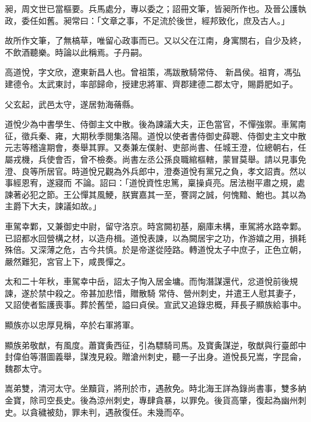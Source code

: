 \begin{pinyinscope}
 昶，周文世已當樞要。兵馬處分，專以委之；詔冊文筆，皆昶所作也。及晉公護執政，委任如舊。昶常曰：「文章之事，不足流於後世，經邦致化，庶及古人。」



 故所作文筆，了無槁草，唯留心政事而已。又以父在江南，身寓關右，自少及終，不飲酒聽樂。時論以此稱焉。子丹嗣。



 高道悅，字文欣，遼東新昌人也。曾祖策，馮跋散騎常侍、
 新昌侯。祖育，馮弘建德令。太武東討，率部歸命，授建忠將軍、齊郡建德二郡太守，賜爵肥如子。



 父玄起，武邑太守，遂居勃海蓨縣。



 道悅少為中書學生、侍御主文中散。後為諫議大夫，正色當官，不憚強禦。車駕南征，徵兵秦、雍，大期秋季閱集洛陽。道悅以使者書侍御史薛聰、侍御史主文中散元志等稽違期會，奏舉其罪。又奏兼左僕射、吏部尚書、任城王澄，位總朝右，任屬戎機，兵使會否，曾不檢奏。尚書左丞公孫良職綰樞轄，蒙冒莫舉。請以見事免澄、良等所居官。時道悅兄觀為外兵郎中，澄奏道悅有黨兄之負，孝文詔責。然以事經恩宥，遂寢而
 不論。詔曰：「道悅資性忠篤，稟操貞亮。居法樹平肅之規，處諫著必犯之節。王公憚其風鯁，朕實嘉其一至，謇諤之誠，何愧黯、鮑也。其以為主爵下大夫，諫議如故。」



 車駕幸鄴，又兼御史中尉，留守洛京。時宮闕初基，廟庫未構，車駕將水路幸鄴。已詔都水回營構之材，以造舟楫。道悅表諫，以為闕居宇之功，作游嬉之用，損耗殊倍。又深薄之危，古今共慎。於是帝遂從陸路。轉道悅太子中庶子，正色立朝，嚴然難犯，宮官上下，咸畏憚之。



 太和二十年秋，車駕幸中岳，詔太子恂入居金墉。而恂潛謀還代，忿道悅前後規諫，遂於禁中殺之。帝甚加悲惜，贈散騎
 常侍、營州刺史，并遣王人慰其妻子，又詔使者監護喪事。葬於舊塋，謚曰貞侯。宣武又追錄忠概，拜長子顯族給事中。



 顯族亦以忠厚見稱，卒於右軍將軍。



 顯族弟敬猷，有風度。蕭寶夤西征，引為驃騎司馬。及寶夤謀逆，敬猷與行臺郎中封偉伯等潛圖義舉，謀洩見殺。贈滄州刺史，聽一子出身。道悅長兄嵩，字昆侖，魏郡太守。



 嵩弟雙，清河太守。坐黷貨，將刑於市，遇赦免。時北海王詳為錄尚書事，雙多納金寶，除司空長史。後為涼州刺史，專肆貪暴，以罪免。後貨高肇，復起為幽州刺史。以貪穢被劾，罪未判，遇赦復任。未幾而卒。




\end{pinyinscope}
